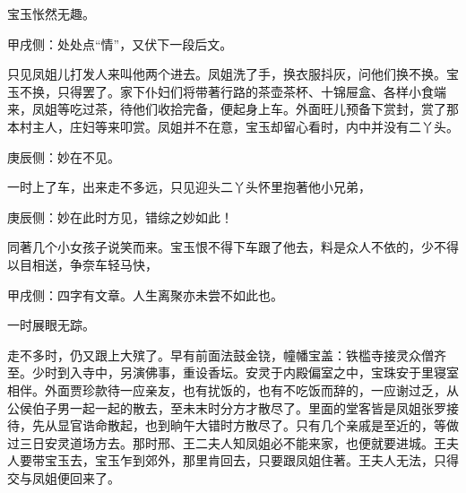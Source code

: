 \begin{parag}
    宝玉怅然无趣。\begin{note}甲戌侧：处处点“情”，又伏下一段后文。\end{note}只见凤姐儿打发人来叫他两个进去。凤姐洗了手，换衣服抖灰，问他们换不换。宝玉不换，只得罢了。家下仆妇们将带著行路的茶壶茶杯、十锦屉盒、各样小食端来，凤姐等吃过茶，待他们收拾完备，便起身上车。外面旺儿预备下赏封，赏了那本村主人，庄妇等来叩赏。凤姐并不在意，宝玉却留心看时，内中并没有二丫头。\begin{note}庚辰侧：妙在不见。\end{note}一时上了车，出来走不多远，只见迎头二丫头怀里抱著他小兄弟，\begin{note}庚辰侧：妙在此时方见，错综之妙如此！\end{note}同著几个小女孩子说笑而来。宝玉恨不得下车跟了他去，料是众人不依的，少不得以目相送，争奈车轻马快，\begin{note}甲戌侧：四字有文章。人生离聚亦未尝不如此也。\end{note}一时展眼无踪。
\end{parag}


\begin{parag}
    走不多时，仍又跟上大殡了。早有前面法鼓金铙，幢幡宝盖：铁槛寺接灵众僧齐至。少时到入寺中，另演佛事，重设香坛。安灵于内殿偏室之中，宝珠安于里寝室相伴。外面贾珍款待一应亲友，也有扰饭的，也有不吃饭而辞的，一应谢过乏，从公侯伯子男一起一起的散去，至未末时分方才散尽了。里面的堂客皆是凤姐张罗接待，先从显官诰命散起，也到晌午大错时方散尽了。只有几个亲戚是至近的，等做过三日安灵道场方去。那时邢、王二夫人知凤姐必不能来家，也便就要进城。王夫人要带宝玉去，宝玉乍到郊外，那里肯回去，只要跟凤姐住著。王夫人无法，只得交与凤姐便回来了。
\end{parag}


